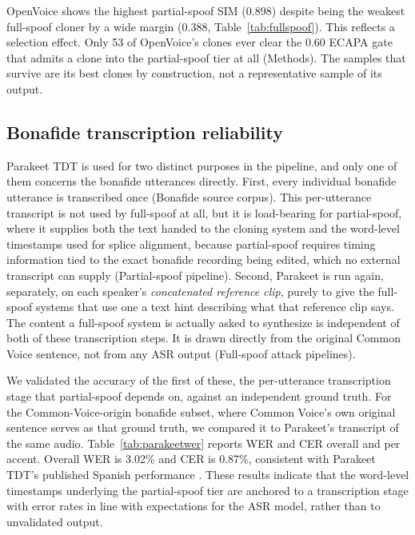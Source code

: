 \documentclass[11pt]{article}
\begin{document}
OpenVoice shows the highest partial-spoof SIM (0.898) despite being the
weakest full-spoof cloner by a wide margin (0.388, Table~\ref{tab:fullspoof}).
This reflects a selection effect. Only 53 of
OpenVoice's clones ever clear the 0.60 ECAPA gate that admits a clone
into the partial-spoof tier at all (Methods). The samples that
survive are its best clones by construction, not a representative
sample of its output.

\FloatBarrier
\subsection*{Bonafide transcription reliability}

Parakeet TDT is used for two distinct purposes in the pipeline, and only
one of them concerns the bonafide utterances directly. First, every
individual bonafide utterance is transcribed once (Bonafide source
corpus). This per-utterance transcript is not used by full-spoof at all,
but it is load-bearing for partial-spoof, where it supplies both the
text handed to the cloning system and the word-level timestamps used for
splice alignment, because partial-spoof requires timing information tied
to the exact bonafide recording being edited, which no external
transcript can supply (Partial-spoof pipeline). Second, Parakeet is run
again, separately, on each speaker's \emph{concatenated reference clip}, purely to give the full-spoof systems that use one a text
hint describing what that reference clip says. The content a full-spoof
system is actually asked to synthesize is independent of both of these
transcription steps. It is drawn directly from the original Common Voice
sentence, not from any ASR output (Full-spoof attack pipelines).

We validated the accuracy of the first of these, the per-utterance
transcription stage that partial-spoof depends on, against an
independent ground truth. For the Common-Voice-origin bonafide subset,
where Common Voice's own original sentence serves as that ground truth,
we compared it to Parakeet's transcript of the same audio.
Table~\ref{tab:parakeetwer} reports WER and CER overall and per accent. Overall WER is 3.02\% and CER
is 0.87\%, consistent with Parakeet TDT's published Spanish performance
\citep{parakeet}. These results indicate that the word-level timestamps
underlying the partial-spoof tier are anchored to a transcription stage
with error rates in line with expectations for the ASR model, rather
than to unvalidated output.
\end{document}
